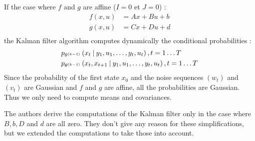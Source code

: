 If the case where $f$ and $g$ are affine ($I=0$ et $J=0$) :
\begin{align*}
  f(x,u) &= Ax + Bu + b\\
  g(x,u) &= Cx + Du + d\\
\end{align*}
the Kalman filter algorithm computes dynamically the conditional probabilities :
\begin{align*}
  &p_{\theta^{(k-1)}}\left(x_t \mathbin{\vert} y_1, u_1, \ldots, y_t, u_t \right), t=1 \ldots T\\
  &p_{\theta^{(k-1)}}\left(x_t, x_{t+1} \mathbin{\vert} y_1, u_1, \ldots, y_t, u_t \right), t=1 \ldots T\\
\end{align*}
Since the probability of the first state $x_0$ and the noise sequences $(w_t)$ and $(v_t)$ are Gaussian and $f$ and $g$ are affine, all the probabilities are Gaussian.
Thus we only need to compute means and covariances.

The authors derive the computations of the Kalman filter only in the case where $B,b,D$ and $d$ are all zero.
They don't give any reason for these simplifications, but we extended the computations to take those into account.

